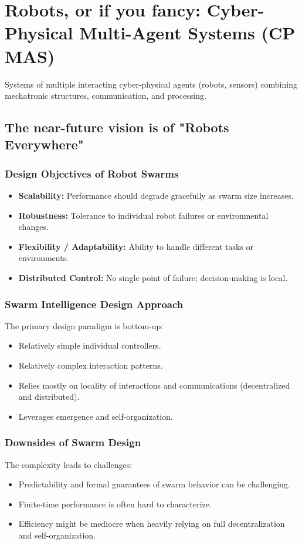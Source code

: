 \chapter*{Robots, or if you fancy: Cyber-Physical Multi-Agent Systems (CP MAS)}
Systems of multiple interacting cyber-physical agents (robots, sensors) combining mechatronic structures, communication, and processing.

\section*{The near-future vision is of "Robots Everywhere"}

\subsection*{Design Objectives of Robot Swarms}
\begin{itemize}
    \item \textbf{Scalability:} Performance should degrade gracefully as swarm size increases.
    \item \textbf{Robustness:} Tolerance to individual robot failures or environmental changes.
    \item \textbf{Flexibility / Adaptability:} Ability to handle different tasks or environments.
    \item \textbf{Distributed Control:} No single point of failure; decision-making is local.
\end{itemize}
\subsection*{Swarm Intelligence Design Approach}
The primary design paradigm is bottom-up:

\begin{itemize}
    \item Relatively simple individual controllers.
    \item Relatively complex interaction patterns.
    \item Relies mostly on locality of interactions and communications (decentralized and distributed).
    \item Leverages emergence and self-organization.
\end{itemize}

\subsection*{Downsides of Swarm Design}
The complexity leads to challenges:
\begin{itemize}
    \item Predictability and formal guarantees of swarm behavior can be challenging.
    \item Finite-time performance is often hard to characterize.
    \item Efficiency might be mediocre when heavily relying on full decentralization and self-organization.
\end{itemize}

